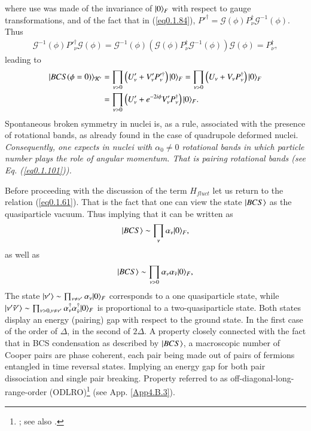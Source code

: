 where use was made of the invariance of $|{0} \rangle_F$ with respect to gauge transformations, and of the fact that in (\ref{eq0.1.84}), $P'^\dagger=\mathcal G(\phi)P^\dagger_\nu\mathcal G^{-1}(\phi)$. Thus 
\begin{align}\label{eq0.1.89}
\mathcal G^{-1}(\phi)P'^\dagger_\nu\mathcal G(\phi)=\mathcal G^{-1}(\phi)\left(\mathcal G(\phi)P^\dagger_\nu\mathcal G^{-1}(\phi)\right)\mathcal G(\phi)=P^\dagger_\nu,
\end{align}
leading to
\begin{align}\label{eq0.1.90}
\nonumber|{BCS(\phi=0)} \rangle_{\mathcal K'}&=\prod_{\nu>0}\left(U'_\nu+V'_\nu P'^\dagger_\nu\right)|{0} \rangle_F=\prod_{\nu>0}\left(U_\nu+V_\nu P^\dagger_\nu\right)|{0} \rangle_F\\
&=\prod_{\nu>0}\left(U'_\nu+e^{-2i\phi}V'_\nu P^\dagger_\nu\right)|{0} \rangle_F.
\end{align}
Spontaneous broken symmetry in nuclei is, as a rule, associated with the presence of rotational bands, as already found in the case of quadrupole deformed nuclei. \textit{Consequently, one expects in nuclei with $\alpha_0\neq0$ rotational bands in which particle number plays the role of angular momentum. That is pairing rotational bands (see Eq. (\ref{eq0.1.101})).}


Before proceeding with the discussion of the term $H_{fluct}$ let us return to the relation (\ref{eq0.1.61}). That is the fact that one can view the state $|{BCS} \rangle$ as the quasiparticle vacuum. Thus implying  that it can be written as
\begin{align}\label{eq1.4.57}
|{BCS} \rangle\sim\prod_{\nu}\alpha_\nu|{0} \rangle_F,
\end{align}
as well as
\begin{align}\label{eq1.4.58}
|{BCS} \rangle\sim\prod_{\nu>0}\alpha_\nu\alpha_{\tilde\nu}|{0} \rangle_F,
\end{align}
The state $|{\nu'} \rangle\sim\prod_{\nu\neq\nu'}\alpha_\nu|{0} \rangle_F$ corresponds to a one quasiparticle state, while $|{\nu'\tilde\nu'} \rangle\sim\prod_{\nu>0,\nu\neq\nu'}\alpha_\nu^\dagger\alpha_{\tilde\nu}^\dagger|{0} \rangle_F$ is proportional to a two-quasiparticle state. Both states display an energy (pairing) gap with respect to the ground state. In the first case of the order of $\Delta$, in the second of $2\Delta$. A property closely connected with the fact that in BCS condensation as described by $|{BCS} \rangle$, a macroscopic number of Cooper pairs are phase coherent, each pair being made out of pairs of fermions entangled in time reversal states. Implying an energy gap for both pair dissociation and single pair breaking. Property referred to as off-diagonal-long-range-order (ODLRO)\footnote{\label{f37c1} \cite{Penrose:51,Penrose:56,Yang:62}; see also \cite{Anderson:96}.} (see App. \ref{App4.B.3}).


